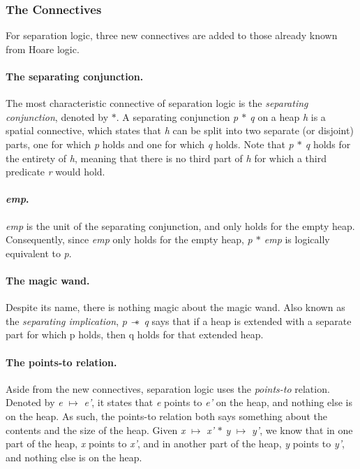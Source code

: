 \subsubsection{The Connectives}
For separation logic, three new connectives are added to those already known from Hoare logic. 
\paragraph{The separating conjunction.}
The most characteristic connective of separation logic is the {\it separating conjunction}, denoted by {\it $\ast$}. A separating conjunction {\it p $\ast$ q} on a heap {\it h} is a spatial connective, which states that {\it h} can be split into two separate (or disjoint) parts, one for which {\it p} holds and one for which {\it q} holds. Note that {\it p $\ast$ q} holds for the entirety of {\it h}, meaning that there is no third part of {\it h} for which a third predicate {\it r} would hold.

\paragraph{{\it emp}.}
{\it emp} is the unit of the separating conjunction, and only holds for the empty heap. Consequently, since {\it emp} only holds for the empty heap, {\it p $\ast$ emp} is logically equivalent to {\it p}.

\paragraph{The magic wand.}
Despite its name, there is nothing magic about the magic wand. Also known as the {\it separating implication}, {\it p $\wand$ q} says that if a heap is extended with a separate part for which p holds, then q holds for that extended heap.

\paragraph{The points-to relation.}
Aside from the new connectives, separation logic uses the {\it points-to} relation. Denoted by {\it e} $\mapsto$ {\it e'}, it states that {\it e} points to {\it e'} on the heap, and nothing else is on the heap. As such, the points-to relation both says something about the contents and the size of the heap. Given {\it x} $\mapsto$ {\it x'} $\ast$ {\it y} $\mapsto$ {\it y'}, we know that in one part of the heap, {\it x} points to {\it x'}, and in another part of the heap, {\it y} points to {\it y'}, and nothing else is on the heap.

